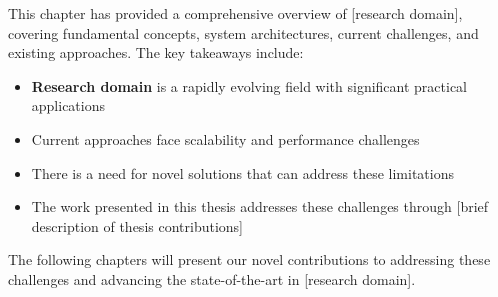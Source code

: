This chapter has provided a comprehensive overview of [research domain], covering fundamental concepts, system architectures, current challenges, and existing approaches. The key takeaways include:

\begin{itemize}
    \item \textbf{Research domain} is a rapidly evolving field with significant practical applications
    \item Current approaches face scalability and performance challenges
    \item There is a need for novel solutions that can address these limitations
    \item The work presented in this thesis addresses these challenges through [brief description of thesis contributions]
\end{itemize}

The following chapters will present our novel contributions to addressing these challenges and advancing the state-of-the-art in [research domain].